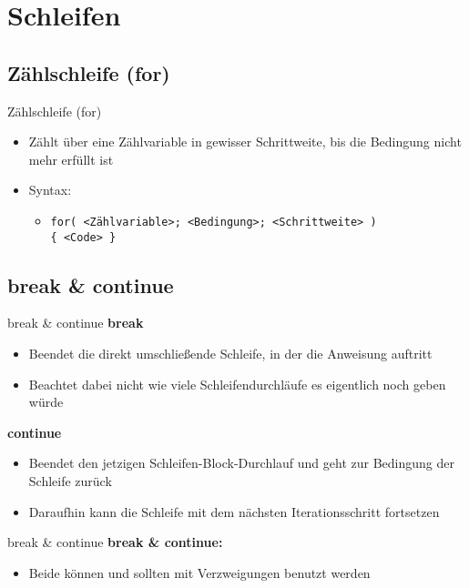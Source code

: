 \section{Schleifen}
\subsection{Zählschleife (for)}
\begin{frame}{Zählschleife (for)}
	\begin{itemize}
		\item Zählt über eine Zählvariable in gewisser Schrittweite, bis die Bedingung nicht mehr erfüllt ist
		\item Syntax:
		\begin{itemize}
			\item \texttt{for( \alert{<Zählvariable>}; \alert{<Bedingung>}; \alert{<Schrittweite>} )\\ \{ \alert{<Code>} \}}
		\end{itemize}
	\end{itemize}
		
\end{frame}

\subsection{break \& continue}
\begin{frame}{break \& continue}
	\textbf{break}\\
	\begin{itemize}
		\item Beendet die direkt umschließende Schleife, in der die Anweisung auftritt
		\item Beachtet dabei nicht wie viele Schleifendurchläufe es eigentlich noch geben würde
	\end{itemize}
	\textbf{continue}\\
	\begin{itemize}
		\item Beendet den jetzigen Schleifen-Block-Durchlauf und geht zur Bedingung der Schleife zurück
		\item Daraufhin kann die Schleife mit dem nächsten Iterationsschritt fortsetzen
	\end{itemize}
\end{frame}

\begin{frame}{break \& continue}
	\textbf{break \& continue:}\\
	\begin{itemize}
		\item Beide können und sollten mit Verzweigungen benutzt werden
	\end{itemize}
	
\end{frame}

